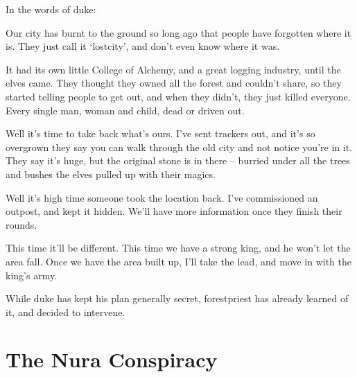 \begin{multicols}{2}

In the words of \gls{duke}:

\begin{exampletext}

	Our city has burnt to the ground so long ago that people have forgotten where it is.
	They just call it `\gls{lostcity}', and don't even know where it was.

	It had its own little College of Alchemy, and a great logging industry, until the elves came.  They thought they owned all the forest and couldn't share, so they started telling people to get out, and when they didn't, they just killed everyone.  Every single man, woman and child, dead or driven out.

	Well it's time to take back what's ours.  I've sent trackers out, and it's so overgrown they say you can walk through the old city and not notice you're in it.  They say it's huge, but the original stone is in there -- burried under all the trees and bushes the elves pulled up with their magics.

	Well it's high time someone took the location back.
	I've commissioned an outpost, and kept it hidden.
	We'll have more information once they finish their rounds.

	This time it'll be different.  This time we have a strong king, and he won't let the area fall.  Once we have the area built up, I'll take the lead, and move in with the king's army.

\end{exampletext}

While \gls{duke} has kept his plan generally secret, \gls{forestpriest} has already learned of it, and decided to intervene.

\end{multicols}

\section{The Nura Conspiracy}

